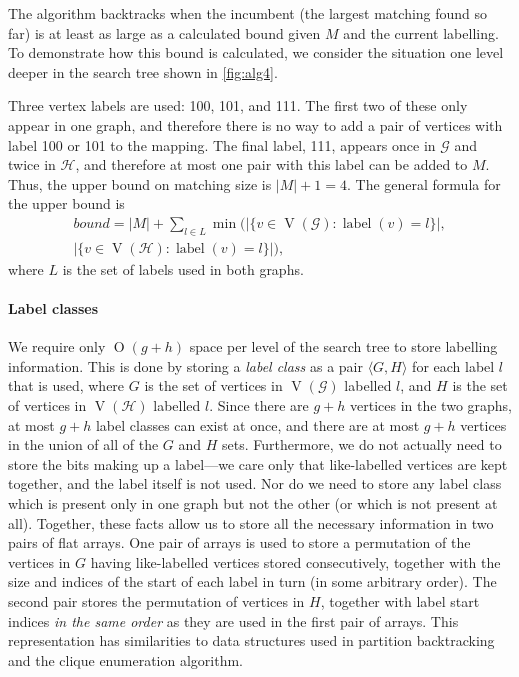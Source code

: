 \documentclass[letterpaper]{article}
\newcommand{\citet}[1]{\citeauthor{#1} \shortcite{#1}}
\newcommand{\citep}[1]{\cite{#1}}
\newcommand{\graphG}{\mathcal{G}}
\newcommand{\graphH}{\mathcal{H}}
\newcommand{\setG}{G}
\newcommand{\setH}{H}
\DeclareMathOperator{\V}{V}
\DeclareMathOperator{\vtxlabel}{label}
\newcommand{\BigO}[1]{\ensuremath{\operatorname{O}\left(#1\right)}}
\begin{document}
The algorithm backtracks when the incumbent (the largest matching found so far) is at least as large
as a calculated bound given $M$ and the current labelling. To demonstrate how
this bound is calculated, we consider the situation one level deeper in the
search tree shown in \cref{fig:alg4}.

Three vertex labels are used: 100,
101, and 111.  The first two of these only appear in one graph, and therefore
there is no way to add a pair of vertices with label 100 or 101 to the mapping.
The final label, 111, appears once in $\graphG$ and twice in $\graphH$, and therefore at
most one pair with this label can be added to $M$.  Thus, the upper bound on
matching size is $|M| + 1 = 4$. The general formula for the upper bound is
\begin{multline*}
    \mathit{bound} = |M| + \sum_{l \in L} \min\big(|\{ v \in \V(\graphG) : \vtxlabel(v)=l\}|, \\[-0.3cm]
        |\{ v \in \V(\graphH) : \vtxlabel(v)=l \}|\big) \text{,}
\end{multline*} where $L$ is the set of labels used in both graphs.


\paragraph{Label classes} We require only $\BigO{g+h}$ space per level of the
search tree to store labelling information.  This is done by storing a
\emph{label class} as a pair $\langle \setG,\setH \rangle$ for each label $l$ that is
used, where $\setG$ is the set of vertices in $\V(\graphG)$ labelled $l$, and $\setH$ is the
set of vertices in $\V(\graphH)$ labelled $l$. Since there are $g + h$ vertices in the two graphs, at most
$g + h$ label classes can exist at once, and there are at most $g + h$ vertices
in the union of all of the $\setG$ and $\setH$ sets. Furthermore, we do not actually
need to store the bits making up a label---we care only that like-labelled
vertices are kept together, and the label itself is not used. Nor do we need to
store any label class which is present only in one graph but not the other (or
which is not present at all).  Together, these facts allow us to store all the
necessary information in two pairs of flat arrays. One pair of arrays is used
to store a permutation of the vertices in $\setG$ having like-labelled vertices
stored consecutively, together with the size and indices of the start of each label in
turn (in some arbitrary order). The second pair stores the permutation of
vertices in $\setH$, together with label start indices \emph{in the same order} as
they are used in the first pair of arrays. This representation has
similarities to data structures used in partition backtracking
\citep{DBLP:conf/wea/Lopez-PresaA09,DBLP:journals/jsc/McKayP14} and the \citet{DBLP:journals/cacm/BronK73}
clique enumeration algorithm.
\end{document}

